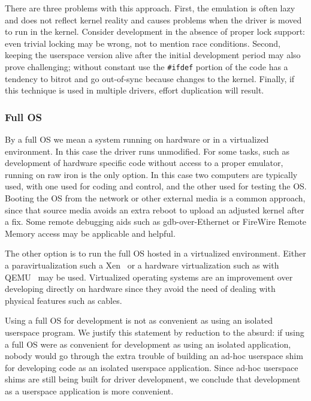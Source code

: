 There are three problems with this approach.  First, the emulation
is often lazy and does not reflect kernel reality and causes
problems when the driver is moved to run in the kernel.  Consider
development in the absence of proper lock support: even trivial
locking may be wrong, not to mention race conditions.  Second,
keeping the userspace version alive after the initial development
period may also prove challenging; without constant use the
\texttt{\#ifdef} portion of the code has a tendency to bitrot and
go out-of-sync because changes to the kernel.  Finally, if this
technique is used in multiple drivers, effort duplication will
result.

\subsubsection*{Full OS}

By a full OS we mean a system running on hardware or in a virtualized
environment.  In this case the driver runs unmodified.  For some
tasks, such as development of hardware specific code without access
to a proper emulator, running on raw iron is the only option.  In
this case two computers are typically used, with one used for coding
and control, and the other used for testing the OS.  Booting the
OS from the network or other external media is a common approach,
since that source media avoids an extra reboot to upload an adjusted kernel
after a fix.  Some remote debugging aids such as gdb-over-Ethernet
or FireWire Remote Memory access may be applicable and helpful.

The other option is to run the full OS hosted in a virtualized
environment.  Either a paravirtualization such a Xen~\cite{barham:xen}
or a hardware virtualization such as with QEMU~\cite{bellard:qemu}
may be used.  Virtualized operating systems are an improvement over
developing directly on hardware since they avoid the need of dealing
with physical features such as cables.

Using a full OS for development is not as convenient as using an
isolated userspace program.  We justify this statement by reduction
to the absurd: if using a full OS were as convenient for development
as using an isolated application, nobody would go through the extra
trouble of building an ad-hoc userspace shim for developing code
as an isolated userspace application.  Since ad-hoc userspace shims
are still being built for driver development, we conclude that
development as a userspace application is more convenient.

